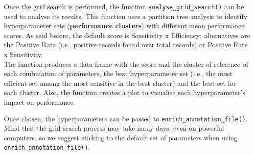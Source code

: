 \documentclass[
]{article}
\begin{document}
Once the grid search is performed, the function
\texttt{analyse\_grid\_search()} can be used to analyse its results.
This function uses a partition tree analysis to identify hyperparameter
sets (\textbf{performance clusters}) with different mean performance
scores. As said before, the default score is Sensitivity x Efficiency;
alternatives are the Positive Rate (i.e., positive records found over
total records) or Positive Rate x Sensitivity.\\
The function produces a data frame with the score and the cluster of
reference of each combination of parameters, the best hyperparameter set
(i.e., the most efficient set among the most sensitive in the best
cluster) and the best set for each cluster. Also, the function creates a
plot to visualise each hyperparameter's impact on performance.

Once chosen, the hyperparameters can be passed to
\texttt{enrich\_annotation\_file()}.\\
Mind that the grid search process may take many days, even on powerful
computers, so we suggest sticking to the default set of parameters when
using \texttt{enrich\_annotation\_file()}.\\
\end{document}
